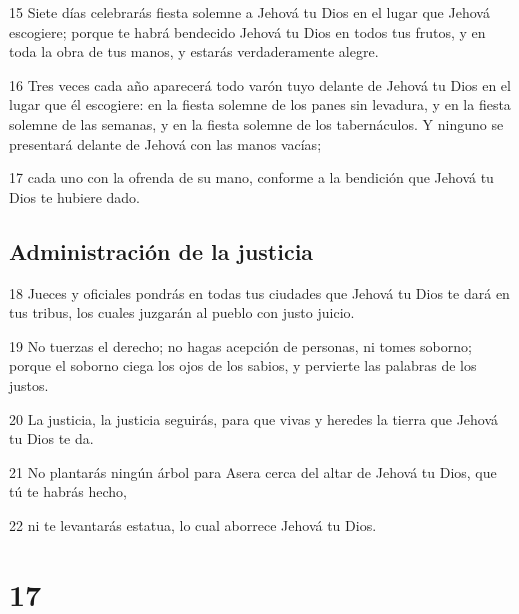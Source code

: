\par 15 Siete días celebrarás fiesta solemne a Jehová tu Dios en el lugar que Jehová escogiere; porque te habrá bendecido Jehová tu Dios en todos tus frutos, y en toda la obra de tus manos, y estarás verdaderamente alegre. 
\par 16 Tres veces cada año aparecerá todo varón tuyo delante de Jehová tu Dios en el lugar que él escogiere: en la fiesta solemne de los panes sin levadura, y en la fiesta solemne de las semanas, y en la fiesta solemne de los tabernáculos. Y ninguno se presentará delante de Jehová con las manos vacías;
\par 17 cada uno con la ofrenda de su mano, conforme a la bendición que Jehová tu Dios te hubiere dado.

\section{Administración de la justicia}

\par 18 Jueces y oficiales pondrás en todas tus ciudades que Jehová tu Dios te dará en tus tribus, los cuales juzgarán al pueblo con justo juicio.
\par 19 No tuerzas el derecho; no hagas acepción de personas, ni tomes soborno; porque el soborno ciega los ojos de los sabios, y pervierte las palabras de los justos.
\par 20 La justicia, la justicia seguirás, para que vivas y heredes la tierra que Jehová tu Dios te da.
\par 21 No plantarás ningún árbol para Asera cerca del altar de Jehová tu Dios, que tú te habrás hecho,
\par 22 ni te levantarás estatua, lo cual aborrece Jehová tu Dios.

\chapter{17}

